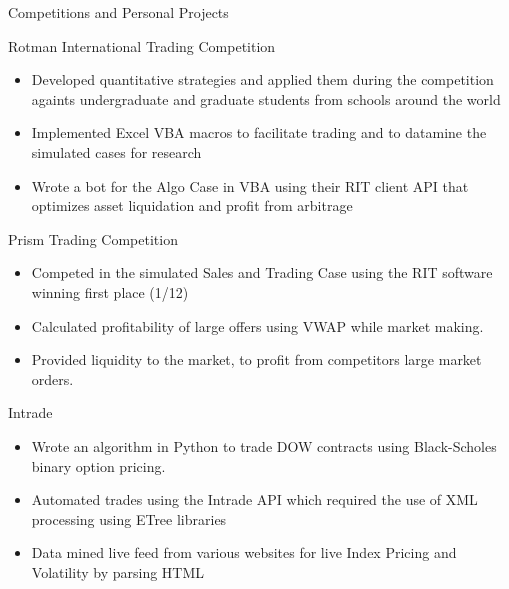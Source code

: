 \documentclass{article}
\newlength{\tabin}
\newlength{\secsep}
\newcommand{\lineunder}{\vspace*{-8pt} \\ \hspace*{-6pt} \hrulefill \\ \vspace*{-15pt}}
\newenvironment{tabbedsection}[1]{
  \begin{list}{}{
      \setlength{\itemsep}{0pt}
      \setlength{\labelsep}{0pt}
      \setlength{\labelwidth}{0pt}
      \setlength{\leftmargin}{\tabin}
      \setlength{\rightmargin}{\tabin}
      \setlength{\listparindent}{0pt}
      \setlength{\parsep}{0pt}
      \setlength{\parskip}{0pt}
      \setlength{\partopsep}{0pt}
      \setlength{\topsep}{#1}
    }
  \item[]
}{\end{list}}
\newenvironment{resume_section}[1]{
  \filbreak
  \vspace{2\secsep}
  \textsc{\large#1}
  \lineunder
  \begin{tabbedsection}{\secsep}
}{\end{tabbedsection}}
\newenvironment{resume_subsection}[2][]{
  \textbf{#2} \hfill {\footnotesize #1} \hspace{2em}
  \begin{tabbedsection}{0.5\secsep}
}{\end{tabbedsection}}
\newenvironment{subitems}{
  \renewcommand{\labelitemi}{-}
  \begin{itemize}
      \setlength{\labelsep}{1em}
}{\end{itemize}}
\begin{document}
\begin{resume_section}{Competitions and Personal Projects}
  \begin{resume_subsection}[(Feburary 2013)]{Rotman International Trading Competition}
    \begin{subitems}
      \item Developed quantitative strategies and applied them during the competition againts undergraduate and graduate students from schools around the world
      \item Implemented Excel VBA macros to facilitate trading and to datamine the simulated cases for research
      \item Wrote a bot for the Algo Case in VBA using their RIT client API that optimizes asset liquidation and profit from arbitrage
    \end{subitems}
  \end{resume_subsection}


  \begin{resume_subsection}[(March 2013)]{Prism Trading Competition}
    \begin{subitems}
      \item Competed in the simulated Sales and Trading Case using the RIT software winning first place (1/12)
      \item Calculated profitability of large offers using VWAP while market making.
      \item Provided liquidity to the market, to profit from competitors large market orders.
    \end{subitems}
  \end{resume_subsection}



  \begin{resume_subsection}[(December 2012)]{Intrade}
    \begin{subitems}
      \item Wrote an algorithm in Python to trade DOW contracts using Black-Scholes binary option pricing.
      \item Automated trades using the Intrade API which required the use of XML processing using ETree libraries
      \item Data mined live feed from various websites for live Index Pricing and Volatility by parsing HTML
    \end{subitems}
  \end{resume_subsection}
  

\end{resume_section}
\end{document}
